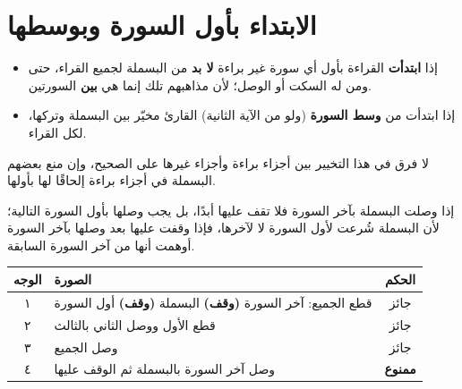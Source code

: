 \section{الابتداء بأول السورة وبوسطها}

\begin{mufradat}
\end{mufradat}
\maana
\begin{itemize}
\item إذا \textbf{ابتدأت} القراءة بأول أي سورة غير براءة \ila{} \textbf{لا بد} من البسملة لجميع القراء، حتى \Hamza{} ومن له السكت أو الوصل؛ لأن مذاهبهم تلك إنما هي \textbf{بين} السورتين.
\item إذا ابتدأت من \textbf{وسط السورة} (ولو من الآية الثانية) \ila{} القارئ مخيّر بين البسملة وتركها، لكل القراء.
\end{itemize}

\begin{tanbih}
لا فرق في هذا التخيير بين أجزاء براءة وأجزاء غيرها على الصحيح، وإن منع بعضهم البسملة في أجزاء براءة إلحاقًا لها بأولها.
\end{tanbih}

\begin{mufradat}
\end{mufradat}
\maana إذا وصلت البسملة بآخر السورة فلا تقف عليها أبدًا، بل يجب وصلها بأول السورة التالية؛ لأن البسملة شُرعت لأول السورة لا لآخرها، فإذا وقفت عليها بعد وصلها بآخر السورة أوهمت أنها من آخر السورة السابقة.

\begin{khulasa}
\centering
\renewcommand{\arraystretch}{1.5}
\begin{tabular}{c l c}
\toprule
\textbf{الوجه} & \textbf{الصورة} & \textbf{الحكم}\\
\midrule
١ & قطع الجميع: آخر السورة \textbf{(وقف)} البسملة \textbf{(وقف)} أول السورة & جائز\\
٢ & قطع الأول ووصل الثاني بالثالث & جائز\\
٣ & وصل الجميع & جائز\\
٤ & وصل آخر السورة بالبسملة ثم الوقف عليها & \textbf{ممنوع}\\
\bottomrule
\end{tabular}
\end{khulasa}

